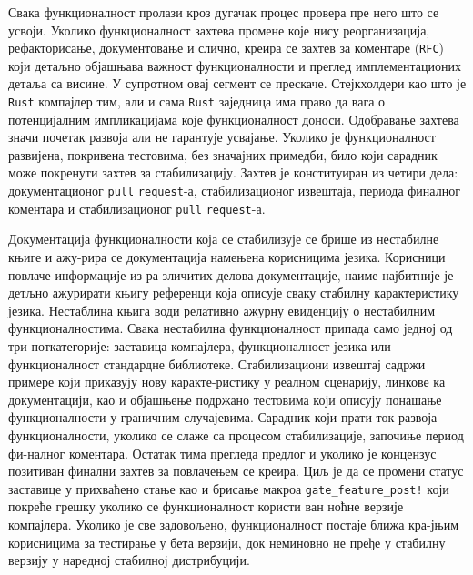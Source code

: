 Свака функционалност пролази кроз дугачак процес провера пре него 
што се усвоји. Уколико функционалност захтева промене које нису реорганизација, рефакторисање, документовање
и слично, креира се захтев за коментаре (\verb|RFC|) који детаљно објашњава важност функционалности и 
преглед имплементационих детаља са висине. У супротном овај сегмент се прескаче. Стејкхолдери као што је \verb|Rust| компајлер тим, али и сама \verb|Rust| заједница 
има право да вага о потенцијалним импликацијама које функционалност доноси. Одобравање захтева значи почетак 
развоја али не гарантује усвајање. Уколико је функционалност развијена, покривена тестовима, 
без значајних примедби, било који сарадник може покренути захтев за стабилизацију. Захтев је конституиран из 
четири дела: документационог \verb|pull| \verb|request|-а, стабилизационог извештаја, 
периода финалног коментара и стабилизационог \verb|pull| \verb|request|-а.

Документација функционалности која се стабилизује се брише из нестабилне књиге \cite{unstable} и ажу\hyp{}рира се 
документација намењена корисницима језика. Корисници повлаче информације из ра\hyp{}зличитих делова документације,
наиме најбитније је детљно ажурирати књигу референци \cite{rust-reference} која описује сваку стабилну 
карактеристику језика. Нестаблина књига води релативно ажурну евиденцију о нестабилним функционалностима.
Свака нестабилна функционалност припада само једној од три поткатегорије: заставица компајлера, функционалност језика или
функционалност стандардне библиотеке. Стабилизациони извештај садржи примере који приказују нову каракте\hyp{}ристику 
у реалном сценарију, линкове ка документацији, као и објашњење подржано тестовима који описују понашање функционалности у 
граничним случајевима. Сарадник који прати ток развоја функционалности, уколико се слаже са процесом 
стабилизације, започиње период фи\hyp{}налног коментара. Остатак тима прегледа предлог и уколико је концензус
позитиван финални захтев за повлачењем се креира. Циљ је да се промени статус заставице у прихваћено
стање као и брисање макроа \verb|gate_feature_post!| који покреће грешку уколико се функционалност користи ван ноћне верзије компајлера.
Уколико је све задовољено, функционалност постаје ближа кра\hyp{}јњим корисницима за тестирање у бета верзији, док
неминовно не пређе у стабилну верзију у наредној стабилној дистрибуцији. 

